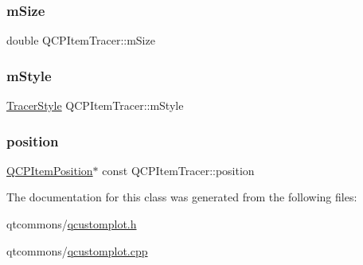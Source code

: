 \subsubsection{\texorpdfstring{mSize}{mSize}}
{\footnotesize\ttfamily double Q\+C\+P\+Item\+Tracer\+::m\+Size\hspace{0.3cm}{\ttfamily [protected]}}

\mbox{\label{class_q_c_p_item_tracer_afb1f236bebf417544e0138fef22a292e}} 
\subsubsection{\texorpdfstring{mStyle}{mStyle}}
{\footnotesize\ttfamily \mbox{\hyperlink{class_q_c_p_item_tracer_a2f05ddb13978036f902ca3ab47076500}{Tracer\+Style}} Q\+C\+P\+Item\+Tracer\+::m\+Style\hspace{0.3cm}{\ttfamily [protected]}}

\mbox{\label{class_q_c_p_item_tracer_a69917e2fdb2b3a929c196958feee7cbe}} 
\subsubsection{\texorpdfstring{position}{position}}
{\footnotesize\ttfamily \mbox{\hyperlink{class_q_c_p_item_position}{Q\+C\+P\+Item\+Position}}$\ast$ const Q\+C\+P\+Item\+Tracer\+::position}



The documentation for this class was generated from the following files\+:\begin{DoxyCompactItemize}
\item 
qtcommons/\mbox{\hyperlink{qcustomplot_8h}{qcustomplot.\+h}}\item 
qtcommons/\mbox{\hyperlink{qcustomplot_8cpp}{qcustomplot.\+cpp}}\end{DoxyCompactItemize}
